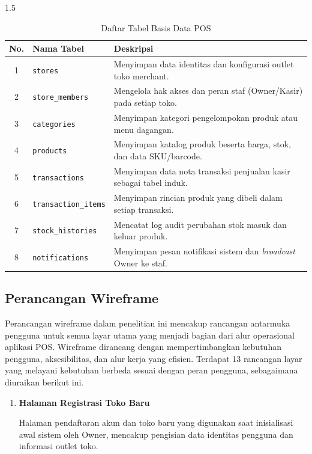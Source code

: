 \documentclass[12pt, a4paper, onecolumn, oneside]{report}
\begin{document}
\begin{spacing}{1.5}
\begin{table}[H]
\centering
\caption{Daftar Tabel Basis Data POS}
\label{tab:database}
\begin{tabularx}{\textwidth}{|c|l|X|}
\hline
\textbf{No.} & \textbf{Nama Tabel} & \textbf{Deskripsi} \\
\hline
1 & \texttt{stores} & Menyimpan data identitas dan konfigurasi outlet toko merchant. \\
\hline
2 & \texttt{store\_members} & Mengelola hak akses dan peran staf (Owner/Kasir) pada setiap toko. \\
\hline
3 & \texttt{categories} & Menyimpan kategori pengelompokan produk atau menu dagangan. \\
\hline
4 & \texttt{products} & Menyimpan katalog produk beserta harga, stok, dan data SKU/barcode. \\
\hline
5 & \texttt{transactions} & Menyimpan data nota transaksi penjualan kasir sebagai tabel induk. \\
\hline
6 & \texttt{transaction\_items} & Menyimpan rincian produk yang dibeli dalam setiap transaksi. \\
\hline
7 & \texttt{stock\_histories} & Mencatat log audit perubahan stok masuk dan keluar produk. \\
\hline
8 & \texttt{notifications} & Menyimpan pesan notifikasi sistem dan \textit{broadcast} Owner ke staf. \\
\hline
\end{tabularx}
\end{table}

\subsection{Perancangan Wireframe}

Perancangan wireframe dalam penelitian ini mencakup rancangan antarmuka pengguna untuk semua layar utama yang menjadi bagian dari alur operasional aplikasi POS. Wireframe dirancang dengan mempertimbangkan kebutuhan pengguna, aksesibilitas, dan alur kerja yang efisien. Terdapat 13 rancangan layar yang melayani kebutuhan berbeda sesuai dengan peran pengguna, sebagaimana diuraikan berikut ini.

\begin{enumerate}

    \item \textbf{Halaman Registrasi Toko Baru}

    Halaman pendaftaran akun dan toko baru yang digunakan saat inisialisasi awal sistem oleh Owner, mencakup pengisian data identitas pengguna dan informasi outlet toko.


\end{enumerate}
\end{spacing}
\end{document}
